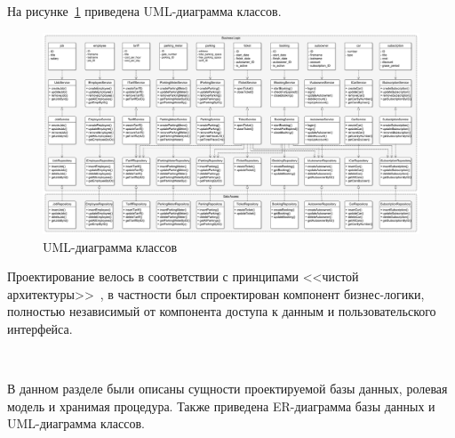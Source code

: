 На рисунке~\ref{fig:uml} приведена UML-диаграмма классов.
\begin{figure}[h]
	\centering
	\includegraphics[height=0.6\textheight, width=1.1\textwidth, angle=90]{svg/UML}
	\caption{UML-диаграмма классов}
	\label{fig:uml}
\end{figure}

Проектирование велось в соответствии с принципами <<чистой архитектуры>>~\cite{martin}, в частности был спроектирован компонент бизнес-логики, полностью независимый от компонента доступа к данным и пользовательского интерфейса.

~

В данном разделе были описаны сущности проектируемой базы данных, ролевая модель и хранимая процедура. Также приведена ER-диаграмма базы данных и UML-диаграмма классов.
